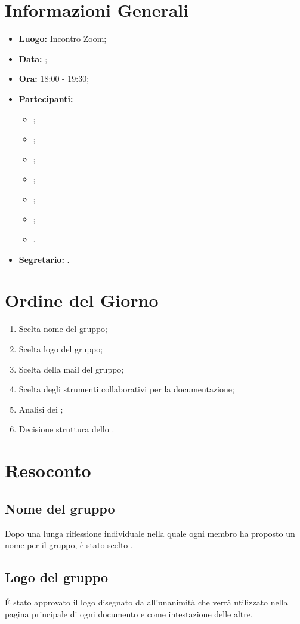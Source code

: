 \section{Informazioni Generali}
\begin{itemize}
\item \textbf{Luogo:} Incontro Zoom;
\item \textbf{Data:} \Data;
\item \textbf{Ora:} 18:00 - 19:30;
\item \textbf{Partecipanti:}
	\begin{itemize}
		\item \BL{}; 
		\item \FF{};
		\item \MM{}; 
		\item \PC{};
		\item \TG{};
		\item \TL{};
		\item \VD{}.
	\end{itemize} 
\item \textbf{Segretario:} \PC{}.
\end{itemize}

\section{Ordine del Giorno}
\begin{enumerate}
 \item Scelta nome del gruppo;
 \item Scelta logo del gruppo;
 \item Scelta della mail del gruppo;
 \item Scelta degli strumenti collaborativi per la documentazione;
 \item Analisi dei ;
 \item Decisione struttura dello \SdF.
\end{enumerate}

\section{Resoconto}
\subsection{Nome del gruppo}
Dopo una lunga riflessione individuale nella quale ogni membro ha proposto un nome per il gruppo, è stato scelto {\Gruppo}.
\subsection{Logo del gruppo}
É stato approvato il logo disegnato da \TG{} all'unanimità che verrà utilizzato nella pagina principale di ogni documento e come intestazione delle altre.
